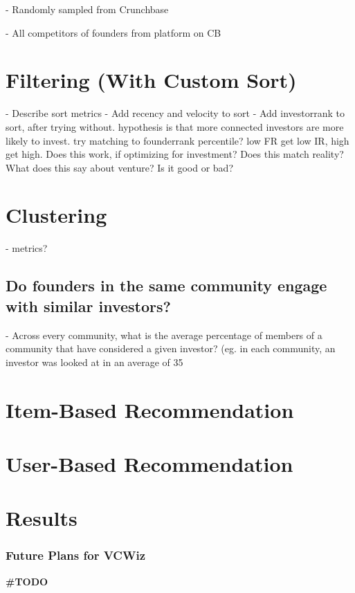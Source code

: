 - Randomly sampled from Crunchbase

- All competitors of founders from platform on CB

\section{Filtering (With Custom Sort)}

- Describe sort metrics
- Add recency and velocity to sort
- Add investorrank to sort, after trying without. hypothesis is that more connected investors are more likely to invest. try matching to founderrank percentile? low FR get low IR, high get high. Does this work, if optimizing for investment? Does this match reality? What does this say about venture? Is it good or bad?

\section{Clustering}

- metrics?

\subsection{Do founders in the same community engage with similar investors?}

- Across every community, what is the average percentage of members of a community that have considered a given investor? (eg. in each community, an investor was looked at in an average of 35%

\section{Item-Based Recommendation}

\section{User-Based Recommendation}

\section{Results}


\subsubsection{Future Plans for VCWiz}

\textbf{\#TODO}
